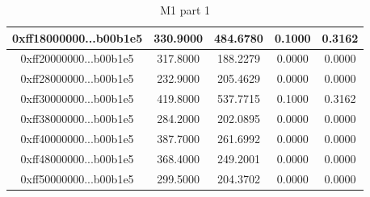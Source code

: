 \documentclass[12pt, a4paper]{article}
\begin{document}
\begin{table}[H]
\begin{tabular}{|c|c|c|c|c|}
0xff18000000...b00b1e5 &      330.9000 &      484.6780 &         0.1000 &        0.3162 \\ \hline
0xff20000000...b00b1e5 &      317.8000 &      188.2279 &         0.0000 &        0.0000 \\ \hline
0xff28000000...b00b1e5 &      232.9000 &      205.4629 &         0.0000 &        0.0000 \\ \hline
0xff30000000...b00b1e5 &      419.8000 &      537.7715 &         0.1000 &        0.3162 \\ \hline
0xff38000000...b00b1e5 &      284.2000 &      202.0895 &         0.0000 &        0.0000 \\ \hline
0xff40000000...b00b1e5 &      387.7000 &      261.6992 &         0.0000 &        0.0000 \\ \hline
0xff48000000...b00b1e5 &      368.4000 &      249.2001 &         0.0000 &        0.0000 \\ \hline
0xff50000000...b00b1e5 &      299.5000 &      204.3702 &         0.0000 &        0.0000 \\ \hline
 \end{tabular}
    \caption{M1 part 1}
    \label{tab:m1_1}
\end{table}
\end{document}

